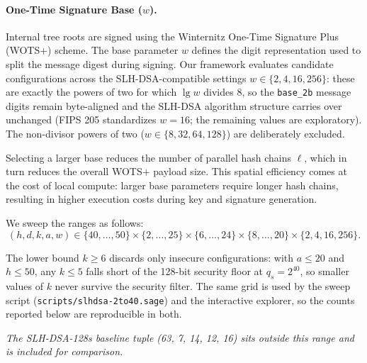 \paragraph{One-Time Signature Base ($w$).}
Internal tree roots are signed using the Winternitz One-Time Signature Plus (WOTS+) scheme. The base parameter $w$ defines the digit representation used to split the message digest during signing. Our framework evaluates candidate configurations across the SLH-DSA-compatible settings $w \in \{2, 4, 16, 256\}$: these are exactly the powers of two for which $\lg w$ divides $8$, so the \texttt{base\_2b} message digits remain byte-aligned and the SLH-DSA algorithm structure carries over unchanged (FIPS 205 standardizes $w = 16$; the remaining values are exploratory). The non-divisor powers of two ($w \in \{8, 32, 64, 128\}$) are deliberately excluded.

Selecting a larger base reduces the number of parallel hash chains $\ell$, which in turn reduces the overall WOTS+ payload size. This spatial efficiency comes at the cost of local compute: larger base parameters require longer hash chains, resulting in higher execution costs during key and signature generation.

We sweep the ranges as follows:
\begin{equation*}
    (h, d, k, a, w) \in \{40, \dots, 50\} \times \{2, \dots, 25\} \times \{6, \dots, 24\} \times \{8, \dots, 20\} \times \{2, 4, 16, 256\}.
\end{equation*}

The lower bound $k \geq 6$ discards only insecure configurations: with $a \leq 20$ and $h \leq 50$, any $k \leq 5$ falls short of the 128-bit security floor at $q_s = 2^{40}$, so smaller values of $k$ never survive the security filter. The same grid is used by the sweep script (\texttt{scripts/slhdsa-2to40.sage}) and the interactive explorer, so the counts reported below are reproducible in both.

\textit{The SLH-DSA-128s baseline tuple (63, 7, 14, 12, 16) sits outside this range and is included for comparison.}